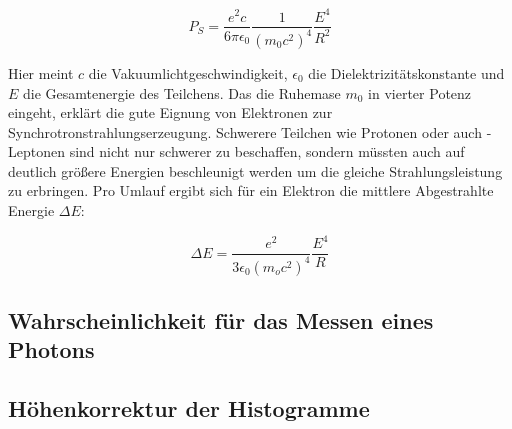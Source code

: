\begin{equation*}
    P_S = \frac{e^2c}{6\pi \epsilon_0}\frac{1}{(m_0c^2)^4}\frac{E^4}{R^2}
\end{equation*}

Hier meint $c$ die Vakuumlichtgeschwindigkeit, $\epsilon_0$ die Dielektrizitätskonstante 
und $E$ die Gesamtenergie des Teilchens. Das die Ruhemase $m_0$ in vierter Potenz eingeht,
erklärt die gute Eignung von Elektronen zur Synchrotronstrahlungserzeugung. Schwerere 
Teilchen wie Protonen oder auch \tau-Leptonen sind nicht nur schwerer zu beschaffen, sondern
müssten auch auf deutlich größere Energien beschleunigt werden um die gleiche Strahlungsleistung
zu erbringen. Pro Umlauf ergibt sich für ein Elektron die mittlere Abgestrahlte Energie $\Delta E$:

\begin{equation*}
    \Delta E = \frac{e^2}{3\epsilon_0(m_oc^2)^4}\frac{E^4}{R}
\end{equation*}







\subsection{Wahrscheinlichkeit für das Messen eines Photons}
\label{sec:Wahrscheinlichkeitsrechnung}

\subsection{Höhenkorrektur der Histogramme}
\label{sec:TheorieKorrektur}


